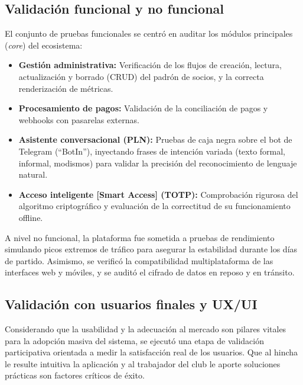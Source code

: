 \documentclass[conference, a4paper]{IEEEtran}
\begin{document}
\subsection{Validaci\'on funcional y no funcional}
El conjunto de pruebas funcionales se centr\'o en auditar los m\'odulos principales (\textit{core}) del ecosistema:

\begin{itemize}
    \item \textbf{Gesti\'on administrativa:} Verificaci\'on de los flujos de creaci\'on, lectura, actualizaci\'on y borrado (CRUD) del padr\'on de socios, y la correcta renderizaci\'on de m\'etricas.
    \item \textbf{Procesamiento de pagos:} Validaci\'on de la conciliaci\'on de pagos y webhooks con pasarelas externas.
    \item \textbf{Asistente conversacional (PLN):} Pruebas de caja negra sobre el bot de Telegram (``BotIn''), inyectando frases de intenci\'on variada (texto formal, informal, modismos) para validar la precisi\'on del reconocimiento de lenguaje natural.
    \item \textbf{Acceso inteligente [Smart Access] (TOTP):} Comprobaci\'on rigurosa del algoritmo criptogr\'afico y evaluaci\'on de la correctitud de su funcionamiento offline.
\end{itemize}

A nivel no funcional, la plataforma fue sometida a pruebas de rendimiento simulando picos extremos de tr\'afico para asegurar la estabilidad durante los d\'ias de partido. Asimismo, se verific\'o la compatibilidad multiplataforma de las interfaces web y m\'oviles, y se audit\'o el cifrado de datos en reposo y en tr\'ansito.

\subsection{Validaci\'on con usuarios finales y UX/UI}
Considerando que la usabilidad y la adecuaci\'on al mercado son pilares vitales para la adopci\'on masiva del sistema, se ejecut\'o una etapa de validaci\'on participativa orientada a medir la satisfacci\'on real de los usuarios. Que al hincha le resulte intuitiva la aplicaci\'on y al trabajador del club le aporte soluciones pr\'acticas son factores cr\'iticos de \'exito.
\end{document}
